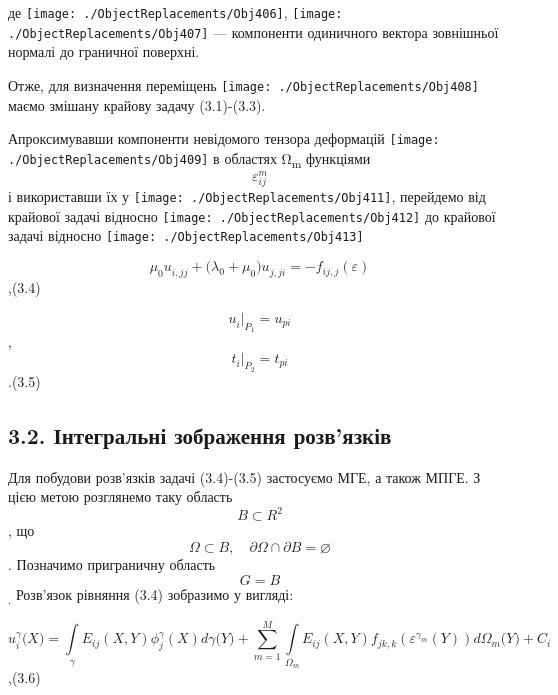 де
\texttt{[image: ./ObjectReplacements/Obj406]},
\texttt{[image: ./ObjectReplacements/Obj407]}
--- компоненти одиничного вектора зовнішньої нормалі до граничної
поверхні.

Отже, для визначення переміщень
\texttt{[image: ./ObjectReplacements/Obj408]}
маємо змішану крайову задачу (3.1)-(3.3).

Апроксимувавши компоненти невідомого тензора деформацій
\texttt{[image: ./ObjectReplacements/Obj409]}
в областях Ω\textsubscript{m} функціями
\[\varepsilon_{\mathit{\text{ij}}}^{m}{}\] і використавши їх у
\texttt{[image: ./ObjectReplacements/Obj411]},
перейдемо від крайової задачі відносно
\texttt{[image: ./ObjectReplacements/Obj412]}
до крайової задачі відносно
\texttt{[image: ./ObjectReplacements/Obj413]}

\[{\mu_{0}{u_{i,\mathit{\text{jj}}}^{} + (}{\lambda_{0} + \mu_{0}}){u_{j,\mathit{\text{ji}}}^{} = {- f_{\mathit{\text{ij}},j}}}(\varepsilon)}{}\],(3.4)

\[{u_{i}^{}{|_{P_{1}} = u_{\mathit{\text{pi}}}}}{}\],
\[{t_{i}^{}{|_{P_{2}} = t_{\mathit{\text{pi}}}}}{}\].(3.5)

\hypertarget{ux456ux43dux442ux435ux433ux440ux430ux43bux44cux43dux456-ux437ux43eux431ux440ux430ux436ux435ux43dux43dux44f-ux440ux43eux437ux432ux44fux437ux43aux456ux432}{%
\subsection[3.2. Інтегральні зображення
розв'язків]{\texorpdfstring{\protect\hypertarget{anchor-46}{}{}3.2.
Інтегральні зображення
розв'язків}{3.2. Інтегральні зображення розв'язків}}\label{ux456ux43dux442ux435ux433ux440ux430ux43bux44cux43dux456-ux437ux43eux431ux440ux430ux436ux435ux43dux43dux44f-ux440ux43eux437ux432ux44fux437ux43aux456ux432}}

\protect\hypertarget{anchor-47}{}{}Для побудови розв'язків задачі
(3.4)-(3.5) застосуємо МГЕ, а також МПГЕ. З цією метою розглянемо таку
область \[{B\subset R^{2}}{}\], що
\[{\Omega\subset B,\quad\partial{\Omega \cap \partial}{B = \varnothing}}{}\].
Позначимо приграничну область \[{G = B}{}\]\textsubscript{. }Розв'язок
рівняння (3.4) зобразимо у вигляді:

\[{u_{i}^{\gamma}(X{) = {\int\limits_{\gamma}{E_{\mathit{\text{ij}}}(X,Y)\phi_{j}^{\gamma}(X)\mathit{d\gamma}(Y{) + {\sum\limits_{m = 1}^{M}{\int\limits_{\Omega_{m}}{E_{\mathit{\text{ij}}}(X,Y)f_{\mathit{\text{jk}},k}(\varepsilon^{\gamma_{m}}(Y))d\Omega_{m}{(Y{) + C_{i}}}}}}}}}}}{}\],(3.6)

